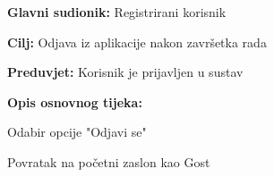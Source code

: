 				
				
				\noindent {}
				\begin{packed_item}
					
					\item \textbf{Glavni sudionik: }Registrirani korisnik
					\item  \textbf{Cilj:} Odjava iz aplikacije nakon završetka rada
					\item  \textbf{Preduvjet:} Korisnik je prijavljen u sustav
					\item  \textbf{Opis osnovnog tijeka:}
					
					\item[] \begin{packed_enum}
						
						\item Odabir opcije "Odjavi se"
						\item Povratak na početni zaslon kao Gost
					
					\end{packed_enum}
					
				\end{packed_item}
				
				
				
